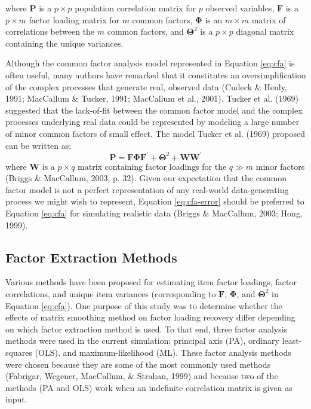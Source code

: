 \documentclass[
  english,
  man]{apa6}
\begin{document}
where \(\mathbf{P}\) is a \(p \times p\) population correlation matrix for \(p\) observed variables, \(\mathbf{F}\) is a \(p \times m\) factor loading matrix for \(m\) common factors, \(\mathbf{\Phi}\) is an \(m \times m\) matrix of correlations between the \(m\) common factors, and \(\mathbf{\Theta}^2\) is a \(p \times p\) diagonal matrix containing the unique variances.

Although the common factor analysis model represented in Equation \eqref{eq:cfa} is often useful, many authors have remarked that it constitutes an oversimplification of the complex processes that generate real, observed data (Cudeck \& Henly, 1991; MacCallum \& Tucker, 1991; MacCallum et al., 2001). Tucker et al. (1969) suggested that the lack-of-fit between the common factor model and the complex processes underlying real data could be represented by modeling a large number of minor common factors of small effect. The model Tucker et al. (1969) proposed can be written as:
\begin{equation}
\mathbf{P} = \mathbf{F} \mathbf{\Phi} \mathbf{F}^{\prime} + \mathbf{\Theta}^2 + \mathbf{WW}^{\prime}
\label{eq:cfa-error}
\end{equation}
where \(\mathbf{W}\) is a \(p \times q\) matrix containing factor loadings for the \(q \gg m\) minor factors (Briggs \& MacCallum, 2003, p. 32). Given our expectation that the common factor model is not a perfect representation of any real-world data-generating process we might wish to represent, Equation \eqref{eq:cfa-error} should be preferred to Equation \eqref{eq:cfa} for simulating realistic data (Briggs \& MacCallum, 2003; Hong, 1999).

\hypertarget{factor-extraction-methods}{%
\subsection{Factor Extraction Methods}\label{factor-extraction-methods}}

Various methods have been proposed for estimating item factor loadings, factor correlations, and unique item variances (corresponding to \(\mathbf{F}\), \(\mathbf{\Phi}\), and \(\mathbf{\Theta}^2\) in Equation \eqref{eq:cfa}). One purpose of this study was to determine whether the effects of matrix smoothing method on factor loading recovery differ depending on which factor extraction method is used. To that end, three factor analysis methods were used in the current simulation: principal axis (PA), ordinary least-squares (OLS), and maximum-likelihood (ML). These factor analysis methods were chosen because they are some of the most commonly used methods (Fabrigar, Wegener, MacCallum, \& Strahan, 1999) and because two of the methods (PA and OLS) work when an indefinite correlation matrix is given as input.
\end{document}
